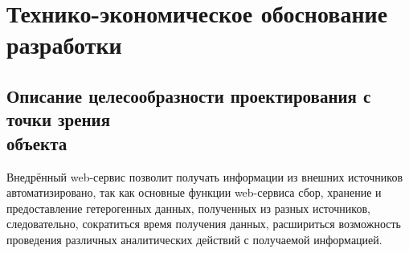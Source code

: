 \section{Технико-экономическое обоснование разработки}
\subsection{Описание целесообразности проектирования с точки зрения \\объекта} 
Внедрённый web-сервис позволит получать информации из внешних источников автоматизировано, так как основные функции web-сервиса сбор, хранение и предоставление гетерогенных данных, полученных из разных источников, следовательно, сократиться время получения данных, расшириться возможность проведения различных аналитических действий с получаемой информацией.

